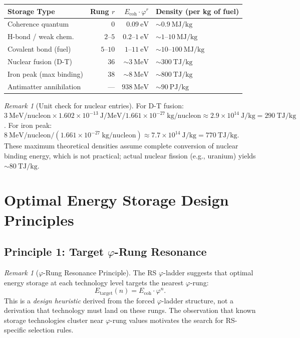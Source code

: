 \documentclass[12pt,a4paper]{article}
\theoremstyle{definition}
\theoremstyle{remark}
\newtheorem{remark}[theorem]{Remark}
\begin{document}
\begin{center}
\begin{tabular}{@{}lrrl@{}}
\toprule
\textbf{Storage Type} & \textbf{Rung $r$} &
\textbf{$E_{\mathrm{coh}}\cdot\varphi^r$} & \textbf{Density (per kg of fuel)} \\
\midrule
Coherence quantum & $0$ & $0.09~\mathrm{eV}$ & $\sim 0.9~\mathrm{MJ/kg}$ \\
H-bond / weak chem. & $2$--$5$ & $0.2$--$1~\mathrm{eV}$ & $\sim 1$--$10~\mathrm{MJ/kg}$ \\
Covalent bond (fuel) & $5$--$10$ & $1$--$11~\mathrm{eV}$ & $\sim 10$--$100~\mathrm{MJ/kg}$ \\
Nuclear fusion (D-T) & $36$ & $\sim 3~\mathrm{MeV}$ & $\sim 300~\mathrm{TJ/kg}$ \\
Iron peak (max binding) & $38$ & $\sim 8~\mathrm{MeV}$ & $\sim 800~\mathrm{TJ/kg}$ \\
Antimatter annihilation & --- & $938~\mathrm{MeV}$ & $\sim 90~\mathrm{PJ/kg}$ \\
\bottomrule
\end{tabular}
\end{center}

\begin{remark}[Unit check for nuclear entries]
For D-T fusion: $3~\mathrm{MeV/nucleon} \times 1.602\times10^{-13}~\mathrm{J/MeV}
/ 1.661\times10^{-27}~\mathrm{kg/nucleon} \approx 2.9\times10^{14}~\mathrm{J/kg}
= 290~\mathrm{TJ/kg}$.
For iron peak: $8~\mathrm{MeV/nucleon} / (1.661\times10^{-27}~\mathrm{kg/nucleon})
\approx 7.7\times10^{14}~\mathrm{J/kg} = 770~\mathrm{TJ/kg}$.
These maximum theoretical densities assume complete conversion of nuclear
binding energy, which is not practical; actual nuclear fission (e.g., uranium)
yields $\sim 80~\mathrm{TJ/kg}$.
\end{remark}

\section{Optimal Energy Storage Design Principles}

\subsection{Principle 1: Target $\varphi$-Rung Resonance}

\begin{remark}[$\varphi$-Rung Resonance Principle]
\label{rem:phi-resonance}
The RS $\varphi$-ladder suggests that optimal energy storage at each
technology level targets the nearest $\varphi$-rung:
\begin{equation}
E_\mathrm{target}(n) = E_\mathrm{coh} \cdot \varphi^n.
\end{equation}
This is a \emph{design heuristic} derived from the forced $\varphi$-ladder
structure, not a derivation that technology must land on these rungs.
The observation that known storage technologies cluster near $\varphi$-rung
values motivates the search for RS-specific selection rules.
\end{remark}
\end{document}
